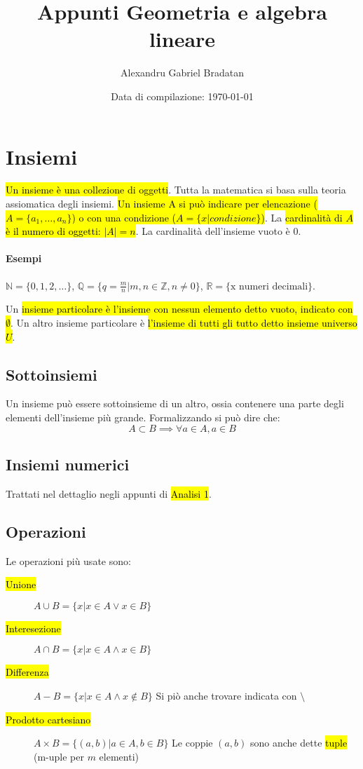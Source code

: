 \documentclass[a4paper,12pt,oneside]{article}
\title{Appunti Geometria e algebra lineare}
\author{Alexandru Gabriel Bradatan}
\date{Data di compilazione: \today}
\begin{document}
\maketitle

\section{Insiemi}
\hl{Un insieme è una collezione di oggetti}. Tutta la matematica si basa 
sulla teoria assiomatica degli insiemi. \hl{Un insieme A si può indicare
per elencazione ($A = \{a_1, \dots, a_n\}$) o con una condizione 
($A = \{x|\textit{condizione}\}$)}. La \hl{cardinalità di $A$ è il numero di 
oggetti: $|A| = n$}. La cardinalità dell'insieme vuoto è 0.

\paragraph{Esempi} $\mathbb{N} = \{0, 1, 2,\dots\}$, 
$\mathbb{Q} = \{q = \frac{m}{n} | m,n \in \mathbb{Z}, n \neq 0\}$, 
$\mathbb{R} = \{\text{x numeri decimali}\}$.

Un \hl{insieme particolare è l'insieme con nessun elemento detto vuoto, indicato 
con $\emptyset$}. Un altro insieme particolare è \hl{l'insieme di tutti gli tutto
detto insieme universo $U$}.

\subsection{Sottoinsiemi}
Un insieme può essere sottoinsieme di un altro, ossia contenere una parte degli
elementi dell'insieme più grande. Formalizzando si può dire che:
\[
    A \subset B \implies \forall a \in A, a \in B
\]

\subsection{Insiemi numerici}
Trattati nel dettaglio negli appunti di \hl{Analisi 1}.

\subsection{Operazioni}
Le operazioni più usate sono:
\begin{description}
    \item[\hl{Unione}] $A \cup B = \{x | x \in A \vee x \in B\}$
    \item[\hl{Interesezione}] $A \cap B = \{x | x \in A \wedge x \in B\}$
    \item[\hl{Differenza}] $A - B = \{x | x \in A \wedge x \notin B\}$
        Si piò anche trovare indicata con $ \setminus $
    \item[\hl{Prodotto cartesiano}] $A \times B = \{(a,b) | a \in A, b \in B \}$
        Le coppie $(a,b)$ sono anche dette \hl{tuple} (m-uple per $m$ elementi)
\end{description}
\end{document}
